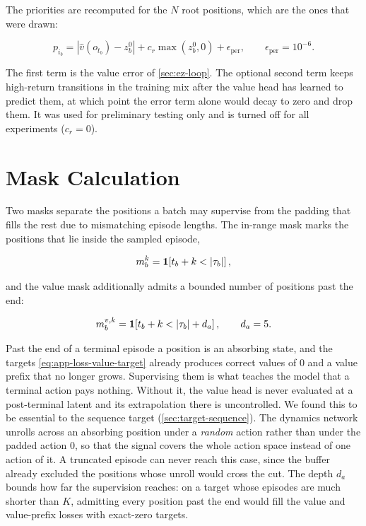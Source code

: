 The priorities are recomputed for the $N$ root positions, which are the ones that were drawn:

\begin{equation}\label{eq:app-loss-priority-update}
  p_{i_b}=\left|\hat v(o_{t_b})-z^0_b\right|
          +c_r\max\!\left(z^0_b,0\right)+\epsilon_{\mathrm{per}},
  \qquad \epsilon_{\mathrm{per}}=10^{-6}.
\end{equation}

The first term is the value error of \cref{sec:ez-loop}.
The optional second term keeps high-return transitions in the training mix after the value head
has learned to predict them, at which point the error term alone would decay to zero and drop them.
It was used for preliminary testing only and is turned off for all experiments ($c_r=0$).

\section{Mask Calculation}\label{sec:app-loss-masks}

Two masks separate the positions a batch may supervise from the padding that fills the rest
due to mismatching episode lengths.
The in-range mask marks the positions that lie inside the sampled episode,

\begin{equation}\label{eq:app-loss-mask}
  m^k_b=\ind{t_b+k<|\tau_b|},
\end{equation}

and the value mask additionally admits a bounded number of positions past the end:

\begin{equation}\label{eq:app-loss-value-mask}
  m^{v,k}_b=\ind{t_b+k<|\tau_b|+d_a},\qquad d_a=5.
\end{equation}

Past the end of a terminal episode a position is an absorbing state, and the targets
\cref{eq:app-loss-value-target} already produces correct values of $0$ and a
value prefix that no longer grows.
Supervising them is what teaches the model that a terminal action pays nothing.
Without it, the value head is never evaluated at a post-terminal latent and its
extrapolation there is uncontrolled.
We found this to be essential to the sequence target (\cref{sec:target-sequence}).
The dynamics network unrolls across an absorbing position under a \emph{random} action rather than
under the padded action $0$, so that the signal covers the whole action space instead of one
action of it.
A truncated episode can never reach this case, since the buffer already excluded the positions
whose unroll would cross the cut.
The depth $d_a$ bounds how far the supervision reaches: on a target whose episodes are much
shorter than $K$, admitting every position past the end would fill the value and value-prefix
losses with exact-zero targets.

